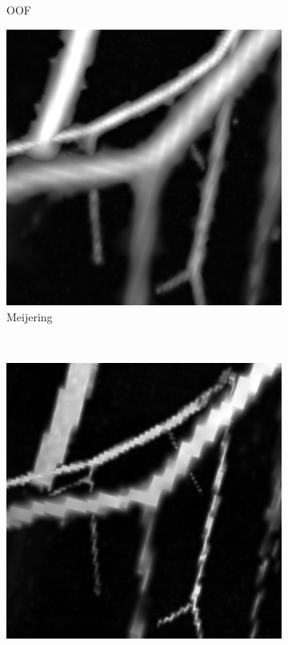 \begin{figure}[!ht]
\begin{subfigure}[t]{0.30\textwidth}
      \caption{OOF}
    \end{subfigure}
    \begin{subfigure}[t]{0.30\textwidth}
      \includegraphics[clip = true,trim  =  170 230 150 240, width=\textwidth]{Images/Vascu_2_k_Meijering.png}
      \caption{Meijering}
    \end{subfigure}
    \\
    \begin{subfigure}[t]{0.30\textwidth}
      \includegraphics[clip = true, trim  =  170 230 150 240, width=\textwidth]{Images/Vascu_2_k_RORPO.png}

\end{subfigure}
\end{figure}
